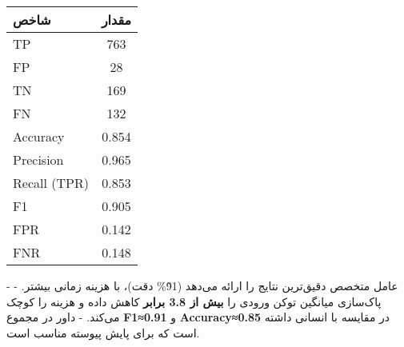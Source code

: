 \begin{center}
\begin{tabular}{|l|c|}
\hline
{} شاخص &  مقدار \\
\hline
TP & 763 \\
FP & 28 \\
TN & 169 \\
FN & 132 \\
Accuracy & 0.854 \\
Precision & 0.965 \\
Recall (TPR) & 0.853 \\
F1 & 0.905 \\
FPR & 0.142 \\
FNR & 0.148 \\
\hline
\end{tabular}
\end{center}


- عامل متخصص دقیق‌ترین نتایج را ارائه می‌دهد (\~91\% دقت)، با هزینه زمانی بیشتر.
- پاک‌سازی  میانگین توکن ورودی را \textbf{بیش از 3.8 برابر} کاهش داده و هزینه را کوچک می‌کند.
- داور  در مجموع \textbf{F1≈0.91} و \textbf{Accuracy≈0.85} در مقایسه با انسانی داشته است که برای پایش پیوسته مناسب است.
